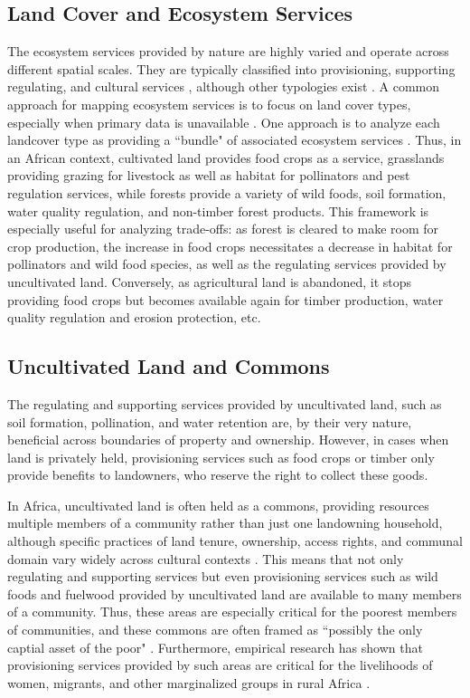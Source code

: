 \documentclass{article}
\begin{document}
\subsection{Land Cover and Ecosystem Services}
The ecosystem services provided by nature are highly varied and operate across different spatial scales.  They are typically classified into provisioning, supporting regulating, and cultural services \cite{Martinez-Harms2012}, although other typologies exist \cite{Fisher2008}.  A common approach for mapping ecosystem services is to focus on land cover types, especially when primary data is unavailable \cite{Martinez-Harms2012}.  One approach is to analyze each landcover type as providing a ``bundle" of associated ecosystem services \cite{Raudsepp-Hearne2010}.  Thus, in an African context, cultivated land provides food crops as a service, grasslands providing grazing for livestock as well as habitat for pollinators and pest regulation services, while forests provide a variety of wild foods, soil formation, water quality regulation, and non-timber forest products.  This framework is especially useful for analyzing trade-offs: as forest is cleared to make room for crop production, the increase in food crops necessitates a decrease in habitat for pollinators and wild food species, as well as the regulating services provided by uncultivated land.  Conversely, as agricultural land is abandoned, it stops providing food crops but becomes available again for timber production, water quality regulation and erosion protection, etc.  

\subsection{Uncultivated Land and Commons}
The regulating and supporting services provided by uncultivated land, such as soil formation, pollination, and water retention are, by their very nature, beneficial across boundaries of property and ownership.  However, in cases when land is privately held, provisioning services such as food crops or timber only provide benefits to landowners, who reserve the right to collect these goods.  

In Africa, uncultivated land is often held as a commons, providing resources multiple members of a community rather than just one landowning household, although specific practices of land tenure, ownership, access rights, and communal domain vary widely across cultural contexts \cite{Wily2008}.  This means that not only regulating and supporting services but even provisioning services such as wild foods and fuelwood provided by uncultivated land are available to many members of a community.  Thus, these areas are especially critical for the poorest members of communities, and these commons are often framed as ``possibly the only captial asset of the poor" \cite{Wily2008}.  Furthermore, empirical research has shown that provisioning services provided by such areas are critical for the livelihoods of women, migrants, and other marginalized groups in rural Africa \cite{Coulibaly-Lingani2009, Pouliot2013}.
\end{document}
